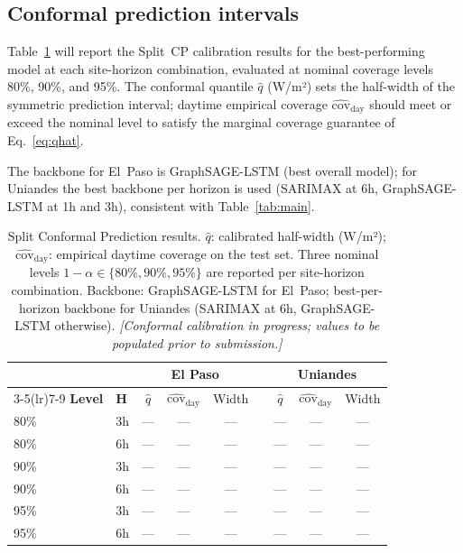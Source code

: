 \subsection{Conformal prediction intervals}
\label{ssec:cp_results}

Table~\ref{tab:conformal} will report the Split~CP calibration results for the
best-performing model at each site-horizon combination, evaluated at nominal
coverage levels 80\%, 90\%, and 95\%.  The conformal quantile $\hat{q}$ (W/m²)
sets the half-width of the symmetric prediction interval; daytime empirical
coverage $\hat{\text{cov}}_\text{day}$ should meet or exceed the nominal level
to satisfy the marginal coverage guarantee of Eq.~\eqref{eq:qhat}.

The backbone for El~Paso is GraphSAGE-LSTM (best overall model); for Uniandes
the best backbone per horizon is used (SARIMAX at 6h, GraphSAGE-LSTM at 1h
and 3h), consistent with Table~\ref{tab:main}.

\begin{table}[t]
  \centering
  \caption{Split Conformal Prediction results. $\hat{q}$: calibrated half-width (W/m²);
           $\hat{\text{cov}}_\text{day}$: empirical daytime coverage on the test set.
           Three nominal levels $1-\alpha \in \{80\%, 90\%, 95\%\}$ are reported per
           site-horizon combination. Backbone: GraphSAGE-LSTM for El~Paso; best-per-horizon
           backbone for Uniandes (SARIMAX at 6h, GraphSAGE-LSTM otherwise).
           \textit{[Conformal calibration in progress; values to be populated prior to
           submission.]}}
  \label{tab:conformal}
  \setlength{\tabcolsep}{5pt}
  \begin{tabular}{llccccccc}
    \toprule
    & & \multicolumn{3}{c}{\textbf{El Paso}} & & \multicolumn{3}{c}{\textbf{Uniandes}} \\
    \cmidrule(lr){3-5}\cmidrule(lr){7-9}
    \textbf{Level} & \textbf{H} &
    $\hat{q}$ & $\hat{\text{cov}}_\text{day}$ & Width &&
    $\hat{q}$ & $\hat{\text{cov}}_\text{day}$ & Width \\
    \midrule
    80\% & 3h & --- & --- & --- && --- & --- & --- \\
    80\% & 6h & --- & --- & --- && --- & --- & --- \\
    \midrule
    90\% & 3h & --- & --- & --- && --- & --- & --- \\
    90\% & 6h & --- & --- & --- && --- & --- & --- \\
    \midrule
    95\% & 3h & --- & --- & --- && --- & --- & --- \\
    95\% & 6h & --- & --- & --- && --- & --- & --- \\
    \bottomrule
  \end{tabular}
\end{table}

